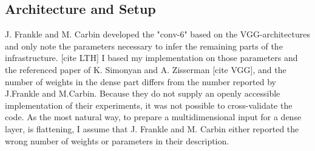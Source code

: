 \subsection*{Architecture and Setup}
J. Frankle and M. Carbin developed the "conv-6" based on the VGG-architectures and only note the parameters necessary to infer the remaining parts of the infrastructure. [cite LTH]
I based my implementation on those parameters and the referenced paper of K. Simonyan and A. Zisserman [cite VGG], and the number of weights in the dense part differs from the number reported by J.Frankle and M.Carbin. Because they do not supply an openly accessible implementation of their experiments, it was not possible to cross-validate the code.
As the most natural way, to prepare a multidimensional input for a dense layer, is flattening, I assume that J. Frankle and M. Carbin either reported the wrong number of weights or parameters in their description.
